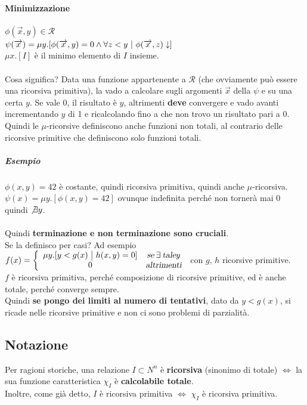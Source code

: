 \documentclass[10pt]{book}
\begin{document}
\paragraph{Minimizzazione} $\phi(\overrightarrow{x}, y) \in \mathscr{R}$\\
$\psi(\overrightarrow{x}) = \mu y.[\phi(\overrightarrow{x}, y) = 0 \wedge \forall z < y\:\:\vline\:\: \phi(\overrightarrow{x}, z)\downarrow] $\\
$\mu x.[I]$ è il minimo elemento di $I$ insieme.\\\\
Cosa significa? Data una funzione appartenente a $\mathscr{R}$ (che ovviamente può essere una ricorsiva primitiva), la vado a calcolare sugli argomenti $\overrightarrow{x}$ della $\psi$ e su una certa $y$. Se vale 0, il risultato è $y$, altrimenti \textbf{deve} convergere e vado avanti incrementando $y$ di 1 e ricalcolando fino a che non trovo un risultato pari a 0.\\
Quindi le $\mu$-ricorsive definiscono anche funzioni non totali, al contrario delle ricorsive primitive che definiscono solo funzioni totali.
\subparagraph{Esempio} $\phi(x, y) = 42$ è costante, quindi ricorsiva primitiva, quindi anche $\mu$-ricorsiva.\\
$\psi(x) = \mu y.[\phi(x, y) = 42]$ ovunque indefinita perché non tornerà mai 0 quindi $\not\exists y$.\\\\
Quindi \textbf{terminazione e non terminazione sono cruciali}.\\
Se la definisco per casi? Ad esempio 
\begin{math}
	f(x) = \left\{
	\begin{array}{c c}
	\mu y.[y < g(x)\:\:\vline\:\: h(x, y) = 0] & \textsl{se}\:\exists\:\textsl{tale} y\\
	0 & \textsl{altrimenti}
	\end{array}
	\right.
\end{math}
con $g$, $h$ ricorsive primitive.\\$f$ è ricorsiva primitiva, perché composizione di ricorsive primitive, ed è anche totale, perché converge sempre.\\
Quindi \textbf{se pongo dei limiti al numero di tentativi}, dato da $y < g(x)$, si ricade nelle ricorsive primitive e non ci sono problemi di parzialità.
\subsection{Notazione}
Per ragioni storiche, una relazione $I \subset N^n$ è \textbf{ricorsiva} (sinonimo di totale) $\Leftrightarrow$ la sua funzione caratteristica $\chi_I$ è \textbf{calcolabile totale}.\\
Inoltre, come già detto, $I$ è ricorsiva primitiva $\Leftrightarrow$ $\chi_I$ è ricorsiva primitiva.
\pagebreak
\end{document}
